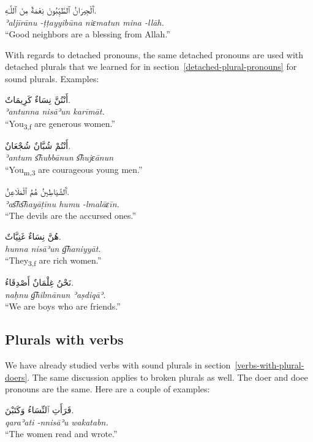 \documentclass[
  10pt,
]{book}
\begin{document}
\foreignlanguage{arabic}{ٱَلْجِيرَانُ ٱلطَّيِّبُونَ نِعْمَةٌ مِنَ ٱللَّـٰهِ.}\\
\emph{ʾaljīrānu -ṭṭayyibūna niɛmatun mina -llāh.}\\
\enquote{Good neighbors are a blessing from Allah.}

With regards to detached pronouns, the same detached pronouns are used with detached plurals that we learned for in section~\ref{detached-plural-pronouns} for sound plurals. Examples:

\foreignlanguage{arabic}{أَنْتُنَّ نِسَاءٌ کَرِيمَاتٌ.}\\
\emph{ʾantunna nisāʾun karīmāt.}\\
\enquote{You\textsubscript{3,f} are generous women.}

\foreignlanguage{arabic}{أَنْتُمْ شُبَّانٌ شُجْعَانٌ.}\\
\emph{ʾantum s͡hubbānun s͡hujɛānun}\\
\enquote{You\textsubscript{m,3} are courageous young men.}

\foreignlanguage{arabic}{ٱَلشَّيَاطِينُ هُمُ ٱلْمَلَاعِنُ.}\\
\emph{ʾas͡hs͡hayāṭīnu humu -lmalāɛīn.}\\
\enquote{The devils are the accursed ones.}

\foreignlanguage{arabic}{هُنَّ نِسَاءٌ غَنِيَّاتٌ.}\\
\emph{hunna nisāʾun g͡haniyyāt.}\\
\enquote{They\textsubscript{3,f} are rich women.}

\foreignlanguage{arabic}{نَحْنُ غِلْمَانٌ أَصْدِقَاءُ.}\\
\emph{naḥnu g͡hilmānun ʾaṣdiqāʾ.}\\
\enquote{We are boys who are friends.}

\subsection{Plurals with verbs}\label{plurals-with-verbs}

We have already studied verbs with sound plurals in section~\ref{verbs-with-plural-doers}. The same discussion applies to broken plurals as well. The doer and doee pronouns are the same. Here are a couple of examples:

\foreignlanguage{arabic}{قَرَأَتِ ٱلنِّسَاءُ وَکَتَبْنَ.}\\
\emph{qaraʾati -nnisāʾu wakatabn.}\\
\enquote{The women read and wrote.}
\end{document}
